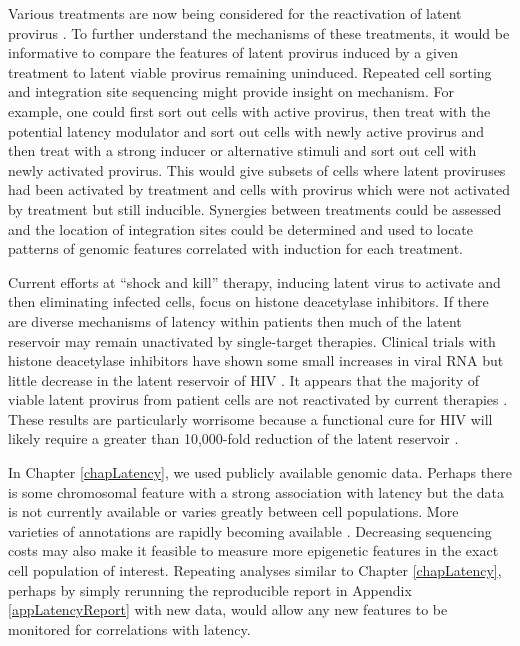\documentclass[../sherrill-Mix_thesis.tex]{subfiles}
\begin{document}
	Various treatments are now being considered for the reactivation of latent provirus \citep{Spina2013}. To further understand the mechanisms of these treatments, it would be informative to compare the features of latent provirus induced by a given treatment to latent viable provirus remaining uninduced. Repeated cell sorting and integration site sequencing might provide insight on mechanism. For example, one could first sort out cells with active provirus, then treat with the potential latency modulator and sort out cells with newly active provirus and then treat with a strong inducer or alternative stimuli and sort out cell with newly activated provirus. This would give subsets of cells where latent proviruses had been activated by treatment and cells with provirus which were not activated by treatment but still inducible. Synergies between treatments could be assessed and the location of integration sites could be determined and used to locate patterns of genomic features correlated with induction for each treatment.

	Current efforts at ``shock and kill'' therapy, inducing latent virus to activate and then eliminating infected cells, focus on histone deacetylase inhibitors. If there are diverse mechanisms of latency within patients then much of the latent reservoir may remain unactivated by single-target therapies.  Clinical trials with histone deacetylase inhibitors have shown some small increases in viral RNA but little decrease in the latent reservoir of HIV \citep{Lehrman2005,Archin2010,Archin2012,Spivak2014}. It appears that the majority of viable latent provirus from patient cells are not reactivated by current therapies \citep{Cillo2014}. These results are particularly worrisome because a functional cure for HIV will likely require a greater than 10,000-fold reduction of the latent reservoir \citep{Hill2014}.

	In Chapter \ref{chapLatency}, we used publicly available genomic data. Perhaps there is some chromosomal feature with a strong association with latency but the data is not currently available or varies greatly between cell populations. More varieties of annotations are rapidly becoming available \citep{ENCODEPC2012,Barrett2013,Karolchik2014,Goldman2015,Cunningham2015}. Decreasing sequencing costs \citep{Metzker2010,Mardis2011,Wetterstrand2015} may also make it feasible to measure more epigenetic features in the exact cell population of interest. Repeating analyses similar to Chapter \ref{chapLatency}, perhaps by simply rerunning the reproducible report in Appendix \ref{appLatencyReport} with new data, would allow any new features to be monitored for correlations with latency.
\end{document}
